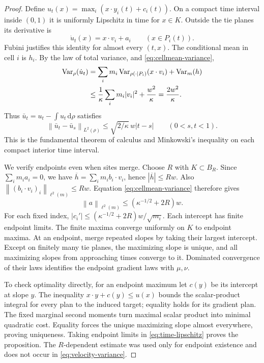 \documentclass[11pt]{article}
\numberwithin{equation}{section}
\theoremstyle{remark}
\newcommand{\Var}{\operatorname{Var}}
\newcommand{\dd}{\,\mathrm d}
\newcommand{\norm}[1]{\left\lVert #1\right\rVert}
\begin{document}
\begin{proof}
Define $u_t(x)=\max_i(x\cdot y_i(t)+c_i(t))$. On a compact time interval inside $(0,1)$ it is uniformly Lipschitz in time for $x\in K$. Outside the tie planes its derivative is
\[
 \dot u_t(x)=x\cdot v_i+a_i\qquad(x\in P_i(t)).
\]
Fubini justifies this identity for almost every $(t,x)$. The conditional mean in cell $i$ is $h_i$. By the law of total variance,  and \eqref{eq:cellmean-variance},
\begin{align}
 \Var_\rho(\dot u_t)
 &=\sum_i m_i\Var_{\rho(\cdot\mid P_i)}(x\cdot v_i)+\Var_m(h)\notag\\
 &\le\frac1\kappa\sum_i m_i|v_i|^2+\frac{w^2}\kappa
 =\frac{2w^2}\kappa.\label{eq:velocity-variance}
\end{align}
Thus $\bar u_t=u_t-\int u_t\dd\rho$ satisfies
\begin{equation}\label{eq:time-lipschitz}
 \norm{\bar u_t-\bar u_s}_{L^2(\rho)}
 \le\sqrt{2/\kappa}\,w|t-s|\qquad(0<s,t<1).
\end{equation}
This is the fundamental theorem of calculus and Minkowski's inequality on each compact interior time interval.

We verify endpoints even when sites merge. Choose $R$ with $K\subset B_R$. Since $\sum_i m_i a_i=0$, we have $\overline h=\sum_i m_i b_i\cdot v_i$, hence $|\overline h|\le Rw$. Also $\norm{(b_i\cdot v_i)_i}_{\ell^2(m)}\le Rw$. Equation \eqref{eq:cellmean-variance} therefore gives
\[
 \norm{a}_{\ell^2(m)}\le(\kappa^{-1/2}+2R)w.
\]
For each fixed index, $|c_i'|\le(\kappa^{-1/2}+2R)w/\sqrt{m_i}$. Each intercept has finite endpoint limits. The finite maxima converge uniformly on $K$ to endpoint maxima. At an endpoint, merge repeated slopes by taking their largest intercept. Except on finitely many tie planes, the maximizing slope is unique, and all maximizing slopes from approaching times converge to it. Dominated convergence of their laws identifies the endpoint gradient laws with $\mu,\nu$.

To check optimality directly, for an endpoint maximum let $c(y)$ be its intercept at slope $y$. The inequality $x\cdot y+c(y)\le u(x)$ bounds the scalar-product integral for every plan to the induced target; equality holds for its gradient plan. The fixed marginal second moments turn maximal scalar product into minimal quadratic cost. Equality forces the unique maximizing slope almost everywhere, proving uniqueness. Taking endpoint limits in \eqref{eq:time-lipschitz} proves the proposition. The $R$-dependent estimate was used only for endpoint existence and does not occur in \eqref{eq:velocity-variance}.
\end{proof}
\end{document}
